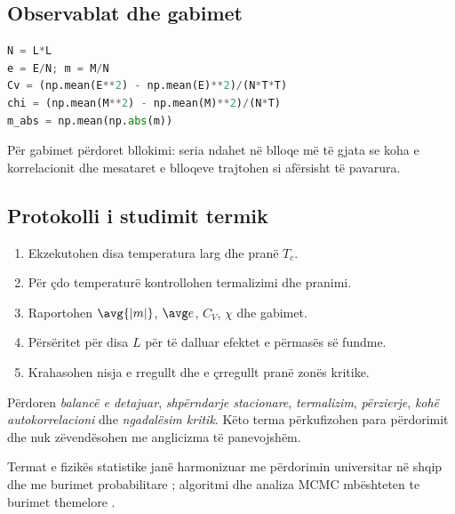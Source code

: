 \subsection{Observablat dhe gabimet}
\begin{lstlisting}[language=Python]
N = L*L
e = E/N; m = M/N
Cv = (np.mean(E**2) - np.mean(E)**2)/(N*T*T)
chi = (np.mean(M**2) - np.mean(M)**2)/(N*T)
m_abs = np.mean(np.abs(m))
\end{lstlisting}
Për gabimet përdoret bllokimi: seria ndahet në blloqe më të gjata se koha e korrelacionit dhe mesataret e blloqeve trajtohen si afërsisht të pavarura.

\subsection{Protokolli i studimit termik}
\begin{enumerate}
\item Ekzekutohen disa temperatura larg dhe pranë $T_c$.
\item Për çdo temperaturë kontrollohen termalizimi dhe pranimi.
\item Raportohen $\avg{|m|}$, $\avg e$, $C_V$, $\chi$ dhe gabimet.
\item Përsëritet për disa $L$ për të dalluar efektet e përmasës së fundme.
\item Krahasohen nisja e rregullt dhe e çrregullt pranë zonës kritike.
\end{enumerate}

\begin{kujdes}
Përdoren \emph{balancë e detajuar}, \emph{shpërndarje stacionare}, \emph{termalizim}, \emph{përzierje}, \emph{kohë autokorrelacioni} dhe \emph{ngadalësim kritik}. Këto terma përkufizohen para përdorimit dhe nuk zëvendësohen me anglicizma të panevojshëm.
\end{kujdes}

Termat e fizikës statistike janë harmonizuar me përdorimin universitar në shqip dhe me burimet probabilitare \cite{capollari,butka}; algoritmi dhe analiza MCMC mbështeten te burimet themelore \cite{metropolis,hastings,krauth,robert,walter}.
